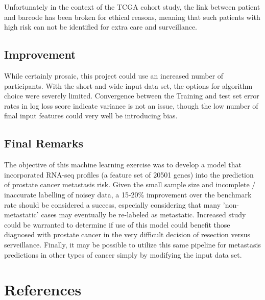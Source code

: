 \documentclass[final]{article}
\begin{document}
Unfortunately in the context of the TCGA cohort study, the link between patient
and barcode has been broken for ethical reasons, meaning that such patients with
high risk can not be identified for extra care and surveillance.
\subsection{Improvement}

While certainly prosaic, this project could use an increased number of participants.
With the short and wide input data set, the options for algorithm choice were severely
limited.  Convergence between the Training and test set error rates in log loss
score indicate variance is not an issue, though the low number of final input features
could very well be introducing bias.

\subsection{Final Remarks}

The objective of this machine learning exercise was to develop a model that
incorporated RNA-seq profiles (a feature set of 20501 genes) into the
prediction of prostate cancer metastasis risk.  Given the small sample size and
incomplete / inaccurate labelling of noisey data, a 15-20\% improvement over the
benchmark rate should be  considered a success, especially considering that many
'non-metastatic' cases may eventually be re-labeled as metastatic.  Increased study could
be warranted to  determine if use of this model could benefit those diagnosed
with prostate cancer in the very difficult decision of resection versus
serveillance.  Finally, it may be possible to utilize this same pipeline for
metastasis predictions in other types of cancer simply by modifying the input data set.

\section{References}
\end{document}
